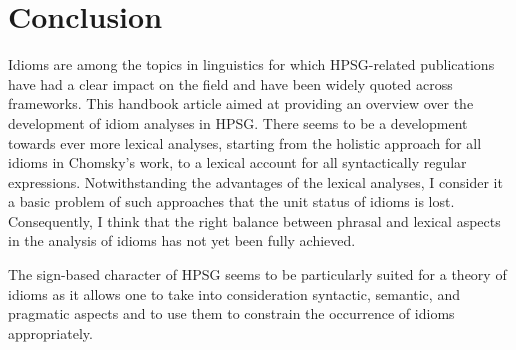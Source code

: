 \documentclass[output=paper
	        ,collection
	        ,collectionchapter
 	        ,biblatex
                ,babelshorthands
                ,newtxmath
                ,draftmode
                ,colorlinks, citecolor=brown
]{langscibook}
\begin{document}

\section{Conclusion}
\label{Sec-Summary}

Idioms are among the topics in linguistics for which HPSG-related publications have had a clear impact on the field and have been widely quoted across frameworks.
This handbook article aimed at providing an overview over the development of idiom analyses in HPSG. 
There seems to be a development towards ever more lexical analyses, starting from the holistic approach for all idioms in Chomsky's work, to a lexical account for all syntactically regular expressions. 
Notwithstanding the advantages of the lexical analyses, 
I consider it a basic problem of such approaches that the unit status of idioms is lost. Consequently, I think that the right balance between phrasal and lexical aspects in the analysis of idioms has not yet been fully achieved.

The sign-based character of HPSG seems to be particularly suited for a theory of idioms as it allows one to take into consideration syntactic, semantic, and pragmatic aspects and to use them to constrain the occurrence of idioms appropriately.
\end{document}
